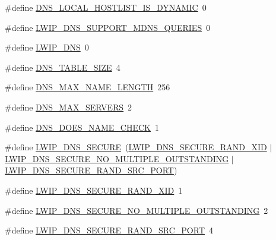 \begin{DoxyCompactItemize}
\item 
\#define \hyperlink{group__lwip__opts__dns_ga8235a5fb0a1c1cceeee670cf95612ba8}{D\+N\+S\+\_\+\+L\+O\+C\+A\+L\+\_\+\+H\+O\+S\+T\+L\+I\+S\+T\+\_\+\+I\+S\+\_\+\+D\+Y\+N\+A\+M\+IC}~0
\item 
\#define \hyperlink{group__lwip__opts__dns_gafcbde5706a70ace562bd1f7d2d6f77cb}{L\+W\+I\+P\+\_\+\+D\+N\+S\+\_\+\+S\+U\+P\+P\+O\+R\+T\+\_\+\+M\+D\+N\+S\+\_\+\+Q\+U\+E\+R\+I\+ES}~0
\item 
\#define \hyperlink{group__lwip__opts__dns_ga98710dd81446b7cb2daac736bae6f646}{L\+W\+I\+P\+\_\+\+D\+NS}~0
\item 
\#define \hyperlink{group__lwip__opts__dns_ga2384e76c1acdf969d883f3de08d340f7}{D\+N\+S\+\_\+\+T\+A\+B\+L\+E\+\_\+\+S\+I\+ZE}~4
\item 
\#define \hyperlink{group__lwip__opts__dns_ga3b01c79902063c170ef57deb72f56124}{D\+N\+S\+\_\+\+M\+A\+X\+\_\+\+N\+A\+M\+E\+\_\+\+L\+E\+N\+G\+TH}~256
\item 
\#define \hyperlink{group__lwip__opts__dns_ga9f9881c887a8aceb9765820c2dbdf292}{D\+N\+S\+\_\+\+M\+A\+X\+\_\+\+S\+E\+R\+V\+E\+RS}~2
\item 
\#define \hyperlink{group__lwip__opts__dns_ga07ffd8e9106dae3b65347bd03811a4b6}{D\+N\+S\+\_\+\+D\+O\+E\+S\+\_\+\+N\+A\+M\+E\+\_\+\+C\+H\+E\+CK}~1
\item 
\#define \hyperlink{group__lwip__opts__dns_ga8979c30dfbfde609d5139f80aabdfcc5}{L\+W\+I\+P\+\_\+\+D\+N\+S\+\_\+\+S\+E\+C\+U\+RE}~(\hyperlink{group__lwip__opts__dns_ga247795be83258f9afd0e3649a20fe30d}{L\+W\+I\+P\+\_\+\+D\+N\+S\+\_\+\+S\+E\+C\+U\+R\+E\+\_\+\+R\+A\+N\+D\+\_\+\+X\+ID} $\vert$ \hyperlink{group__lwip__opts__dns_ga5cabf5668bb2532408d9dcb8caf56092}{L\+W\+I\+P\+\_\+\+D\+N\+S\+\_\+\+S\+E\+C\+U\+R\+E\+\_\+\+N\+O\+\_\+\+M\+U\+L\+T\+I\+P\+L\+E\+\_\+\+O\+U\+T\+S\+T\+A\+N\+D\+I\+NG} $\vert$ \hyperlink{group__lwip__opts__dns_ga3aa0b17e6093d9e109790b28d6adfa65}{L\+W\+I\+P\+\_\+\+D\+N\+S\+\_\+\+S\+E\+C\+U\+R\+E\+\_\+\+R\+A\+N\+D\+\_\+\+S\+R\+C\+\_\+\+P\+O\+RT})
\item 
\#define \hyperlink{group__lwip__opts__dns_ga247795be83258f9afd0e3649a20fe30d}{L\+W\+I\+P\+\_\+\+D\+N\+S\+\_\+\+S\+E\+C\+U\+R\+E\+\_\+\+R\+A\+N\+D\+\_\+\+X\+ID}~1
\item 
\#define \hyperlink{group__lwip__opts__dns_ga5cabf5668bb2532408d9dcb8caf56092}{L\+W\+I\+P\+\_\+\+D\+N\+S\+\_\+\+S\+E\+C\+U\+R\+E\+\_\+\+N\+O\+\_\+\+M\+U\+L\+T\+I\+P\+L\+E\+\_\+\+O\+U\+T\+S\+T\+A\+N\+D\+I\+NG}~2
\item 
\#define \hyperlink{group__lwip__opts__dns_ga3aa0b17e6093d9e109790b28d6adfa65}{L\+W\+I\+P\+\_\+\+D\+N\+S\+\_\+\+S\+E\+C\+U\+R\+E\+\_\+\+R\+A\+N\+D\+\_\+\+S\+R\+C\+\_\+\+P\+O\+RT}~4

\end{DoxyCompactItemize}
